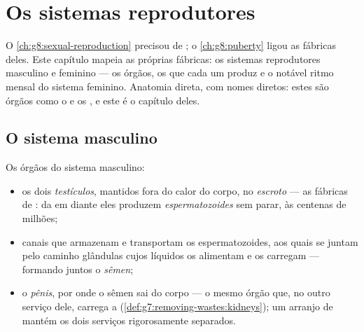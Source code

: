 \chapter{Os sistemas reprodutores}\label{ch:g8:reproductive-systems}

O \cref{ch:g8:sexual-reproduction} precisou de ; o
\cref{ch:g8:puberty} ligou as fábricas deles. Este capítulo mapeia as
próprias fábricas: os sistemas reprodutores masculino e feminino --- os
órgãos, os  que cada um produz e o notável ritmo mensal do
sistema feminino. Anatomia direta, com nomes diretos: estes são órgãos
como o  e os , e este é o capítulo deles.

\section{O sistema masculino}

\begin{definition}\label{def:g8:reproductive-systems:male}
Os órgãos do sistema masculino:
\begin{itemize}
  \item os dois \emph{testículos}, mantidos fora do
        calor do corpo, no \emph{escroto} --- as fábricas de :
        da  em diante eles produzem
        \emph{espermatozoides} sem parar, às
        centenas de milhões;
  \item canais que armazenam e transportam os espermatozoides, aos
        quais se juntam pelo caminho glândulas cujos líquidos os
        alimentam e os carregam --- formando juntos o \emph{sêmen};
  \item o \emph{pênis}, por onde o sêmen sai do corpo ---
        o mesmo órgão que, no outro serviço dele, carrega a 
        (\cref{def:g7:removing-wastes:kidneys}); um arranjo de 
        mantém os dois serviços rigorosamente separados.
\end{itemize}
\end{definition}

